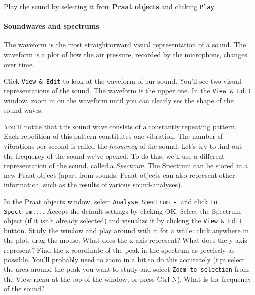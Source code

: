 \documentclass[a4paper, 9pt]{article}
\begin{document}
\begin{exercise}
\action Play the sound by selecting it from \textbf{Praat objects} and clicking \texttt{Play}.
\end{exercise}


\paragraph{Soundwaves and spectrums}\label{soundwaves-and-spectrums}

The waveform is the most straightforward visual representation of a sound. The waveform is a plot of how the air pressure, recorded by the microphone, changes over time.

\begin{exercise}
\action Click \texttt{View \& Edit} to look at the waveform of our sound.
You'll see two visual representations of the sound. The waveform is the
upper one.
\action In the \texttt{View \& Edit} window, zoom in on the waveform until you can clearly see the shape of the sound waves.
\end{exercise}

You'll notice that this sound wave consists of a constantly repeating
pattern. Each repetition of this pattern constitutes one vibration. The
number of vibrations per second is called the \emph{frequency} of the
sound.
Let's try to find out the frequency of the sound we've opened. To do
this, we'll use a different representation of the sound, called a
\emph{Spectrum}. The Spectrum can be stored in a new Praat object (apart
from sounds, Praat objects can also represent other information, such as
the results of various sound-analyses).

\begin{exercise}
\action In the Praat objects window, select \texttt{Analyse Spectrum -}, and click \texttt{To Spectrum...}. Accept the default settings by clicking OK.
\action Select the Spectrum object (if it isn't already selected) and visualize it by clicking the \texttt{View \& Edit} button.
\action Study the window and play around with it for a while: click anywhere in the plot, drag the mouse. What does the x-axis represent? What does the y-axis represent?
\action Find the x-coordinate of the peak in the spectrum as precisely as possible. You'll probably need to zoom in a bit to do this accurately (tip: select the area around the peak you want to study and select \texttt{Zoom to selection} from the View menu at the top of the window, or press Ctrl-N). What is the frequency of the sound? 
\end{exercise}
\end{document}
